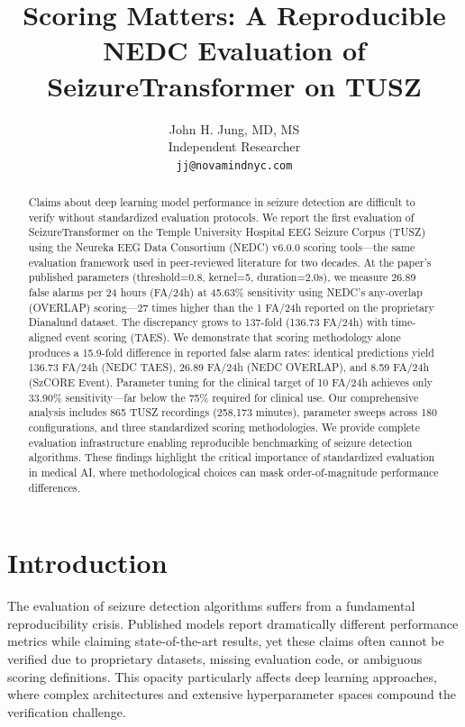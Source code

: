 \documentclass[10pt]{article}
\title{\textbf{Scoring Matters: A Reproducible NEDC Evaluation of SeizureTransformer on TUSZ}}
\author{
John H. Jung, MD, MS\\
Independent Researcher\\
\texttt{jj@novamindnyc.com}
}
\date{}
\begin{document}
\maketitle

\begin{abstract}
Claims about deep learning model performance in seizure detection are difficult to verify without standardized evaluation protocols. We report the first evaluation of SeizureTransformer on the Temple University Hospital EEG Seizure Corpus (TUSZ) using the Neureka EEG Data Consortium (NEDC) v6.0.0 scoring tools—the same evaluation framework used in peer-reviewed literature for two decades. At the paper's published parameters (threshold=0.8, kernel=5, duration=2.0s), we measure 26.89 false alarms per 24 hours (FA/24h) at 45.63\% sensitivity using NEDC's any-overlap (OVERLAP) scoring—27 times higher than the 1 FA/24h reported on the proprietary Dianalund dataset. The discrepancy grows to 137-fold (136.73 FA/24h) with time-aligned event scoring (TAES). We demonstrate that scoring methodology alone produces a 15.9-fold difference in reported false alarm rates: identical predictions yield 136.73 FA/24h (NEDC TAES), 26.89 FA/24h (NEDC OVERLAP), and 8.59 FA/24h (SzCORE Event). Parameter tuning for the clinical target of 10 FA/24h achieves only 33.90\% sensitivity—far below the 75\% required for clinical use. Our comprehensive analysis includes 865 TUSZ recordings (258,173 minutes), parameter sweeps across 180 configurations, and three standardized scoring methodologies. We provide complete evaluation infrastructure enabling reproducible benchmarking of seizure detection algorithms. These findings highlight the critical importance of standardized evaluation in medical AI, where methodological choices can mask order-of-magnitude performance differences.
\end{abstract}

\section{Introduction}

The evaluation of seizure detection algorithms suffers from a fundamental reproducibility crisis. Published models report dramatically different performance metrics while claiming state-of-the-art results, yet these claims often cannot be verified due to proprietary datasets, missing evaluation code, or ambiguous scoring definitions. This opacity particularly affects deep learning approaches, where complex architectures and extensive hyperparameter spaces compound the verification challenge.
\end{document}
